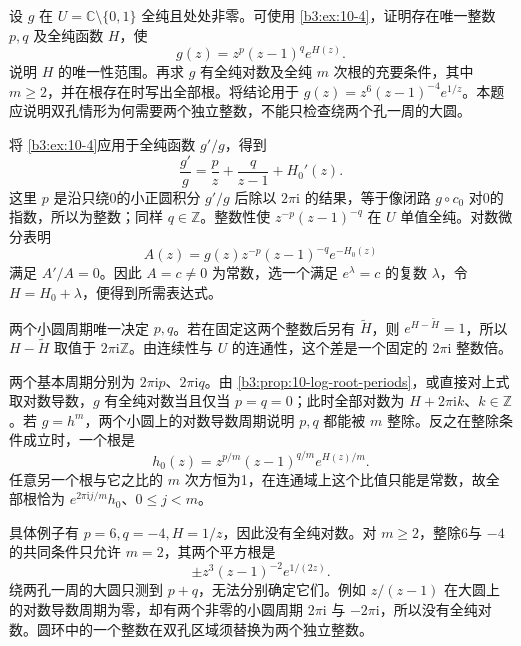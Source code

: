 \begin{exercise}\label{b3:ex:10-7}
设 \(g\) 在 \(U=\mathbb C\setminus\{0,1\}\) 全纯且处处非零。可使用 \cref{b3:ex:10-4}，证明存在唯一整数 \(p,q\) 及全纯函数 \(H\)，使
\[
 g(z)=z^p(z-1)^q e^{H(z)}.
\]
说明 \(H\) 的唯一性范围。再求 \(g\) 有全纯对数及全纯 \(m\) 次根的充要条件，其中 \(m\ge2\)，并在根存在时写出全部根。将结论用于 \(g(z)=z^6(z-1)^{-4}e^{1/z}\)。本题应说明双孔情形为何需要两个独立整数，不能只检查绕两个孔一周的大圆。
\end{exercise}
\begin{solution}
将 \cref{b3:ex:10-4}应用于全纯函数 \(g'/g\)，得到
\[
 \frac{g'}g=\frac{p}{z}+\frac{q}{z-1}+H_0'(z).
\]
这里 \(p\) 是沿只绕0的小正圆积分 \(g'/g\) 后除以 \(2\pi\mathrm i\) 的结果，等于像闭路 \(g\circ c_0\) 对0的指数，所以为整数；同样 \(q\in\mathbb Z\)。整数性使 \(z^{-p}(z-1)^{-q}\) 在 \(U\) 单值全纯。对数微分表明
\[
 A(z)=g(z)z^{-p}(z-1)^{-q}e^{-H_0(z)}
\]
满足 \(A'/A=0\)。因此 \(A=c\ne0\) 为常数，选一个满足 \(e^\lambda=c\) 的复数 \(\lambda\)，令 \(H=H_0+\lambda\)，便得到所需表达式。

两个小圆周期唯一决定 \(p,q\)。若在固定这两个整数后另有 \(\widetilde H\)，则 \(e^{H-\widetilde H}=1\)，所以 \(H-\widetilde H\) 取值于 \(2\pi\mathrm i\mathbb Z\)。由连续性与 \(U\) 的连通性，这个差是一个固定的 \(2\pi\mathrm i\) 整数倍。

两个基本周期分别为 \(2\pi\mathrm i p\)、\(2\pi\mathrm i q\)。由 \cref{b3:prop:10-log-root-periods}，或直接对上式取对数导数，\(g\) 有全纯对数当且仅当 \(p=q=0\)；此时全部对数为 \(H+2\pi\mathrm i k\)、\(k\in\mathbb Z\)。若 \(g=h^m\)，两个小圆上的对数导数周期说明 \(p,q\) 都能被 \(m\) 整除。反之在整除条件成立时，一个根是
\[
 h_0(z)=z^{p/m}(z-1)^{q/m}e^{H(z)/m}.
\]
任意另一个根与它之比的 \(m\) 次方恒为1，在连通域上这个比值只能是常数，故全部根恰为 \(e^{2\pi\mathrm i j/m}h_0\)、\(0\le j<m\)。

具体例子有 \(p=6,q=-4,H=1/z\)，因此没有全纯对数。对 \(m\ge2\)，整除6与 \(-4\) 的共同条件只允许 \(m=2\)，其两个平方根是
\[
 \pm z^3(z-1)^{-2}e^{1/(2z)}.
\]
绕两孔一周的大圆只测到 \(p+q\)，无法分别确定它们。例如 \(z/(z-1)\) 在大圆上的对数导数周期为零，却有两个非零的小圆周期 \(2\pi\mathrm i\) 与 \(-2\pi\mathrm i\)，所以没有全纯对数。圆环中的一个整数在双孔区域须替换为两个独立整数。
\end{solution}

